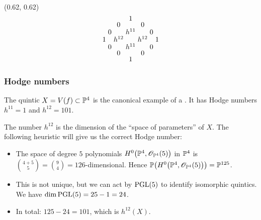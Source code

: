 \begin{frame}
{
    \begin{textblock}{0.4}(0.62, 0.62)
        \[
            \arraycolsep = 1.5pt
            \def\arraystretch{0.7}
            \begin{array}[c]{ccccccc}
                &&& 1                          \\
                &&  0 && 0                     \\
                &   0 && h^{11} && 0           \\
                    1 && h^{12} && h^{12} && 1 \\
                &   0 && h^{11} && 0           \\
                &&  0 && 0                     \\
                &&& 1 
            \end{array}
        \]
    \end{textblock}
}
\end{frame}


\begin{frame}
\frametitle{Hodge numbers}

The quintic $X = V(f) \subset \P^4$ is the canonical example of a \CY. It has Hodge numbers $h^{11}=1$ and $h^{12}=101$.

\begin{remark}[Heuristic]
    The number $h^{12}$ is the dimension of the ``space of parameters'' of $X$. The following heuristic will give us the correct Hodge number:
    \begin{itemize}
	    \item
	    The space of degree $5$ polynomials $H^0\big(\P^4, \OO_{\P^4}(5)\big)$ in $\P^4$ is $\binom{4 + 5}{5} = \binom{9}{4} = 126$-dimensional. Hence $\P\big(H^0\big(\P^4, \OO_{\P^4}(5)\big)\big) = \P^{125}$.

	    \item
	    This is not unique, but we can act by $\PGL(5)$ to identify isomorphic quintics. We have $\dim \PGL(5)=25-1=24$.

	    \item
	    In total: $125 - 24 = 101$, which is $h^{12}(X)$.
    \end{itemize}
\end{remark}

\end{frame}